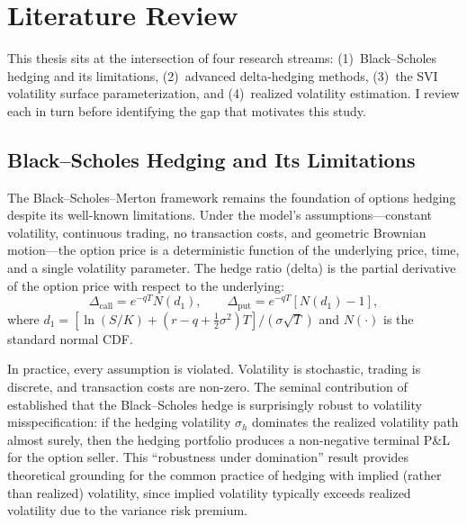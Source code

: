 \documentclass[12pt, letterpaper]{article}
\begin{document}
\section{Literature Review}
\label{sec:literature}

This thesis sits at the intersection of four research streams: (1)~Black--Scholes hedging and its limitations, (2)~advanced delta-hedging methods, (3)~the SVI volatility surface parameterization, and (4)~realized volatility estimation. I review each in turn before identifying the gap that motivates this study.

\subsection{Black--Scholes Hedging and Its Limitations}

The Black--Scholes--Merton framework \citep{Black1973, Merton1973} remains the foundation of options hedging despite its well-known limitations. Under the model's assumptions---constant volatility, continuous trading, no transaction costs, and geometric Brownian motion---the option price is a deterministic function of the underlying price, time, and a single volatility parameter. The hedge ratio (delta) is the partial derivative of the option price with respect to the underlying:
\begin{equation}
    \Delta_{\text{call}} = e^{-qT} N(d_1), \qquad \Delta_{\text{put}} = e^{-qT} [N(d_1) - 1],
    \label{eq:bsm_delta}
\end{equation}
where $d_1 = [\ln(S/K) + (r - q + \tfrac{1}{2}\sigma^2)T] / (\sigma\sqrt{T})$ and $N(\cdot)$ is the standard normal CDF.

In practice, every assumption is violated. Volatility is stochastic, trading is discrete, and transaction costs are non-zero. The seminal contribution of \citet{ElKaroui1998} established that the Black--Scholes hedge is surprisingly robust to volatility misspecification: if the hedging volatility $\sigma_h$ dominates the realized volatility path almost surely, then the hedging portfolio produces a non-negative terminal P\&L for the option seller. This ``robustness under domination'' result provides theoretical grounding for the common practice of hedging with implied (rather than realized) volatility, since implied volatility typically exceeds realized volatility due to the variance risk premium.
\end{document}
